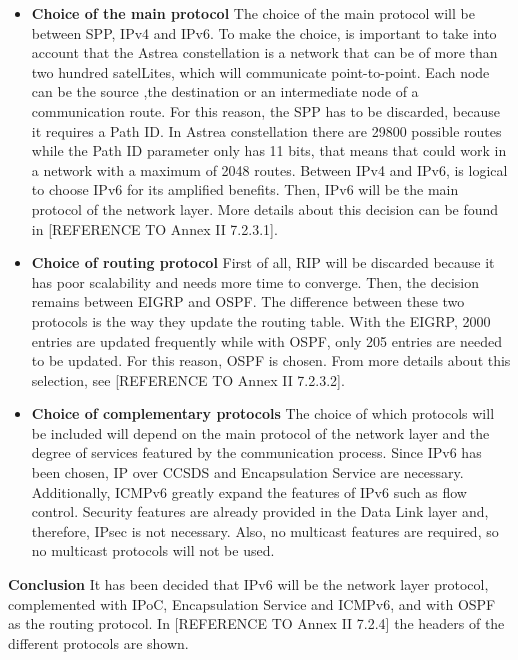 \begin{itemize}
\item \textbf{Choice of the main protocol}
The choice of the main protocol will be between SPP, IPv4 and IPv6. To make the choice, is important to take into account that the Astrea constellation is a network that can be of more than two hundred satelLites, which will communicate point-to-point. Each node can be the source ,the destination or an intermediate node of a communication route.
For this reason, the SPP has to be discarded, because it requires a Path ID. In Astrea constellation there are 29800 possible routes while the Path ID parameter only has 11 bits, that means that could work in a network with a maximum of 2048 routes. Between IPv4 and IPv6, is logical to choose IPv6 for its amplified benefits. Then, IPv6 will be the main protocol of the network layer. More details about this decision can be found in [REFERENCE TO Annex II 7.2.3.1]. 
\item \textbf{Choice of routing protocol}
First of all, RIP will be discarded because it has poor scalability and needs more time to converge. Then, the decision remains between EIGRP and OSPF. The difference between these two protocols is the way they update the routing table. With the EIGRP, 2000 entries are updated frequently while with OSPF, only 205 entries are needed to be updated. For this reason, OSPF is chosen. From more details about this selection, see [REFERENCE TO Annex II 7.2.3.2].
\item \textbf{Choice of complementary protocols}
The choice of which protocols will be included will depend on the main protocol of the network layer and the degree of services featured by the communication process.
Since IPv6 has been chosen, IP over CCSDS and Encapsulation Service are necessary. Additionally, ICMPv6 greatly expand the features of IPv6 such as flow control. Security features are already provided in the Data Link layer and, therefore, IPsec is not necessary. Also, no multicast features are required, so no multicast protocols will not be used.
\end{itemize}
\textbf{Conclusion}
It has been decided that IPv6 will be the network layer protocol, complemented with IPoC, Encapsulation Service and ICMPv6, and with OSPF as the routing protocol. In [REFERENCE TO Annex II 7.2.4] the headers of the different protocols are shown. 
